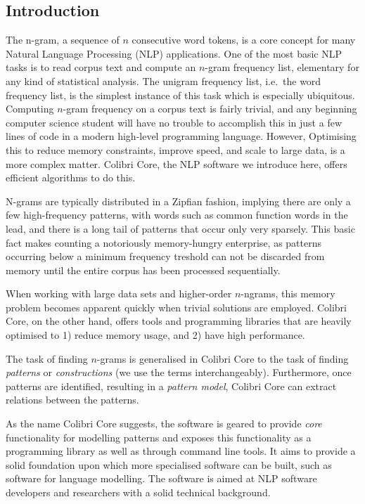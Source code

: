 \documentclass[a4paper,12pt]{article}
\begin{document}
\subsection{Introduction}

The n-gram, a sequence of $n$ consecutive word tokens, is a core concept for
many Natural Language Processing (NLP) applications. One of the most basic NLP
tasks is to read corpus text and compute an $n$-gram frequency list, elementary
for any kind of statistical analysis. The unigram frequency list, i.e.\ the
word frequency list, is the simplest instance of this task which is especially
ubiquitous. Computing $n$-gram frequency on a corpus text is fairly trivial,
and any beginning computer science student will have no trouble to accomplish
this in just a few lines of code in a modern high-level programming language.
However, Optimising this to reduce memory constraints, improve speed, and scale
to large data, is a more complex matter. Colibri Core, the NLP software we
introduce here, offers efficient algorithms to do this.

N-grams are typically distributed in a Zipfian fashion, implying there are only
a few high-frequency patterns, with words such as common function words in the
lead, and there is a long tail of patterns that occur only very sparsely. This
basic fact makes counting a notoriously memory-hungry enterprise, as patterns
occurring below a minimum frequency treshold can not be discarded from
memory until the entire corpus has been processed sequentially. 

When working with large data sets and higher-order $n$-ngrams, this memory
problem becomes apparent quickly when trivial solutions are employed. Colibri
Core, on the other hand, offers tools and programming libraries that are
heavily optimised to 1) reduce memory usage, and 2) have high performance.

The task of finding $n$-grams is generalised in Colibri Core to the task of
finding \emph{patterns} or \emph{constructions} (we use the terms
interchangeably). Furthermore, once patterns are identified, resulting in a
\emph{pattern model}, Colibri Core can extract relations between the patterns.

As the name Colibri Core suggests, the software is geared to provide
\emph{core} functionality for modelling patterns and exposes this functionality
as a programming library as well as through command line tools. It aims to
provide a solid foundation upon which more specialised software can be built,
such as software for language modelling. The software is aimed at
NLP software developers and researchers with a solid technical background. 
\end{document}
